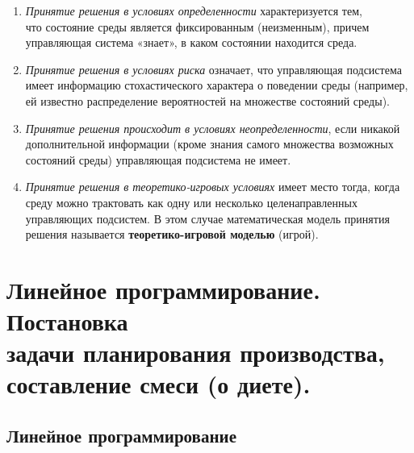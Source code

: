 \documentclass[17pt]{extarticle}
\begin{document}
\begin{enumerate}
    \item \textit{Принятие решения в условиях определенности} характеризуется тем, \\
          что состояние среды является фиксированным (неизменным), причем управляющая система «знает», в каком состоянии находится среда.

    \item \textit{Принятие решения в условиях риска} означает,
          что управляющая подсистема имеет информацию стохастического характера о поведении среды
          (например, ей известно распределение вероятностей на множестве состояний среды).

    \item \textit{Принятие решения происходит в условиях неопределенности},
          если никакой дополнительной информации (кроме знания самого множества возможных состояний среды) управляющая подсистема не имеет.

    \item \textit{Принятие решения в теоретико-игровых условиях} имеет место тогда,
          когда среду можно трактовать как одну или несколько целенаправленных управляющих подсистем.
          В этом случае математическая модель принятия решения называется \textbf{теоретико-игровой моделью} (игрой).
\end{enumerate}



\section{Линейное программирование. Постановка \\ задачи планирования производства, составление смеси (о диете).}
\subsection{Линейное программирование}
\end{document}
